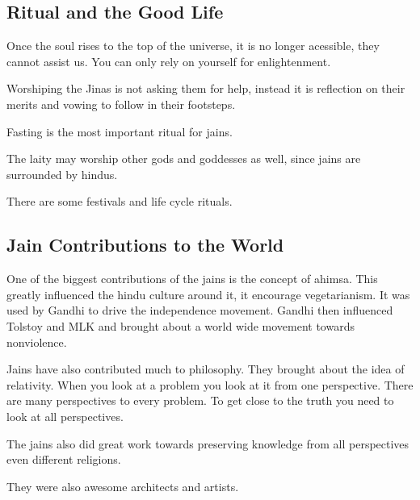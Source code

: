 \documentclass{article}
\begin{document}
\subsection*{Ritual and the Good Life}
\label{sec:ritual_and_the_good_life}
Once the soul rises to the top of the universe, it is no longer acessible, they cannot assist us. You can only rely on yourself for enlightenment.

Worshiping the Jinas is not asking them for help, instead it is reflection on their merits and vowing to follow in their footsteps.

Fasting is the most important ritual for jains.

The laity may worship other gods and goddesses as well, since jains are surrounded by hindus.

There are some festivals and life cycle rituals.

\subsection*{Jain Contributions to the World}
\label{sec:jain_contributions_to_the_world}
One of the biggest contributions of the jains is the concept of ahimsa. This greatly influenced the hindu culture around it, it encourage vegetarianism. It was used by Gandhi to drive the independence movement. Gandhi then influenced Tolstoy and MLK and brought about a world wide movement towards nonviolence.

Jains have also contributed much to philosophy. They brought about the idea of relativity. When you look at a problem you look at it from one perspective. There are many perspectives to every problem. To get close to the truth you need to look at all perspectives.

The jains also did great work towards preserving knowledge from all perspectives even different religions.

They were also awesome architects and artists.
\end{document}
